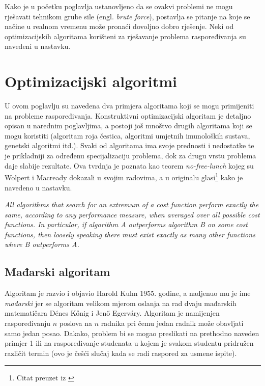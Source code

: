 \documentclass[times, utf8, zavrsni]{fer}
\begin{document}
Kako je u početku poglavlja ustanovljeno da se ovakvi problemi ne mogu rješavati tehnikom grube sile (engl. \textit{brute force}), postavlja
se pitanje na koje se načine u realnom vremenu može pronaći dovoljno dobro rješenje. Neki od optimizacijskih algoritama korišteni
za rješavanje problema raspoređivanja su navedeni u nastavku.

\section{Optimizacijski algoritmi}
U ovom poglavlju su navedena dva primjera algoritama koji se mogu primijeniti na probleme raspoređivanja. Konstruktivni optimizacijski
algoritam je detaljno opisan u narednim poglavljima, a postoji još mnoštvo drugih algoritama koji se mogu koristiti (algoritam roja
čestica, algoritmi umjetnih imunoloških sustava, genetski algoritmi itd.). Svaki od algoritama ima svoje prednosti i nedostatke te je
prikladniji za određenu specijalizaciju problema, dok za drugu vrstu problema daje slabije rezultate. Ova tvrdnja je poznata kao
teorem \emph{no-free-lunch} kojeg su Wolpert i Macready dokazali u svojim radovima, a u originalu glasi\footnote{Citat preuzet iz \cite{cupic2013prirodom}}
kako je navedeno u nastavku.

\begin{framed}
\emph{All algorithms that search for an extremum of a cost function perform exactly the same, according to any performance measure,
when averaged over all possible cost functions. In particular, if algorithm A outperforms algorithm B on some cost functions, then
loosely speaking there must exist exactly as many other functions where B outperforms A.}
\end{framed}



\subsection{Mađarski algoritam}
Algoritam je razvio i objavio Harold Kuhn 1955. godine, a nadjenuo mu je ime \textit{mađarski} jer se algoritam velikom mjerom oslanja
na rad dvaju mađarskih matematičara Dénes Kőnig i Jenő Egerváry.
Algoritam je namijenjen raspoređivanju $n$ poslova na $n$ radnika pri čemu jedan radnik može obavljati samo jedan posao. Dakako,
problem bi se mogao preslikati na prethodno naveden primjer 1 ili na raspoređivanje studenata u kojem je svakom studentu pridružen
različit termin (ovo je češći slučaj kada se radi raspored za usmene ispite).
\end{document}
